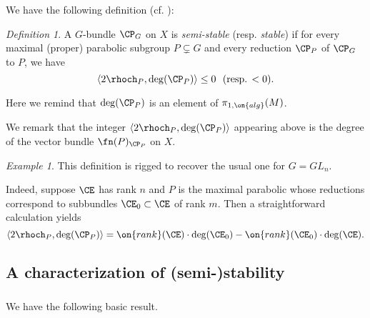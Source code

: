 \documentclass[9pt]{amsart}
\theoremstyle{remark}
\newtheorem{example}[subsubsection]{Example}
\newtheorem{defin}[subsubsection]{Definition}
\theoremstyle{definition}
\theoremstyle{remark}
\numberwithin{equation}{section}
\begin{document}
\subsubsection{}

We have the following definition (cf. \cite{Ra}):

\begin{defin}

A $G$-bundle $\CP_G$ on $X$ is \emph{semi-stable} (resp. \emph{stable})
if for every maximal (proper) parabolic subgroup 
$P \subsetneq G$ and every reduction
$\CP_P$ of $\CP_G$ to $P$, we have
%
\[
\langle 2\rhoch_P,\deg(\CP_P)\rangle \leq 0 \,\,\,\, \text{(resp. $< 0$)}. 
\]

\noindent Here we remind that $\deg(\CP_P)$ is an element of 
$\pi_{1,\on{alg}}(M)$.

\end{defin}

We remark that the integer $\langle 2\rhoch_P,\deg(\CP_P)\rangle$ appearing
above is the degree of the vector bundle $\fn(P)_{\CP_P}$ on $X$.

\begin{example}

This definition is rigged to recover the usual one for 
$G = GL_n$. 

\medskip

Indeed, suppose $\CE$ has rank $n$ and $P$ is the maximal parabolic
whose reductions correspond to subbundles $\CE_0 \subset \CE$ of rank $m$.
Then a straightforward calculation yields
\[
\langle 2\rhoch_P,\deg(\CP_P)\rangle = 
\on{rank}(\CE)\cdot\deg(\CE_0) - \on{rank}(\CE_0)\cdot\deg(\CE).
\]

\end{example}

\subsection{A characterization of (semi-)stability}

\subsubsection{}

We have the following basic result.
\end{document}
